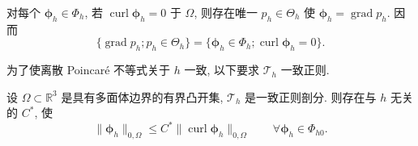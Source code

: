 \begin{Remark}\label{rem:incompressible-nedelec-discrete-gradient-kernel}
对每个 $\boldsymbol\phi_h\in\Phi_h$,
若 $\operatorname{curl}\boldsymbol\phi_h=0$ 于 $\Omega$,
则存在唯一 $p_h\in\Theta_h$ 使
$\boldsymbol\phi_h=\operatorname{grad}p_h$. 因而
\[
\{\operatorname{grad}p_h;p_h\in\Theta_h\}
=\{\boldsymbol\phi_h\in\Phi_h;
\operatorname{curl}\boldsymbol\phi_h=0\}.
\]
\end{Remark}

为了使离散 Poincaré 不等式关于 $h$ 一致,
以下要求 $\mathcal T_h$ 一致正则.
\begin{Proposition}\label{prop:incompressible-nedelec-uniform-discrete-poincare}
设 $\Omega\subset\mathbb R^3$ 是具有多面体边界的有界凸开集,
$\mathcal T_h$ 是一致正则剖分. 则存在与 $h$ 无关的 $C^*$, 使
\begin{equation}\label{eq:incompressible-nedelec-uniform-discrete-poincare}
\|\boldsymbol\phi_h\|_{0,\Omega}
\leq C^*\|\operatorname{curl}\boldsymbol\phi_h\|_{0,\Omega}
\qquad\forall\boldsymbol\phi_h\in\Phi_{h0}.
\end{equation}
\end{Proposition}

